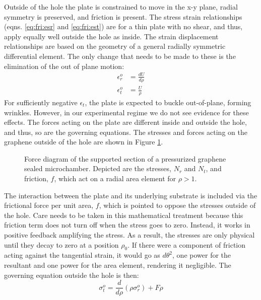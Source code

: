 Outside of the hole the plate is constrained to move in the x-y plane, radial symmetry is preserved, and friction is present. 
The stress strain relationships (eqns. \ref{eq:fri:esr} and \ref{eq:fri:est}) are for a thin plate with no shear, and thus, apply equally well outside the hole as inside.
The strain displacement relationships are based on the geometry of a general radially symmetric differential element.
The only change that needs to be made to these is the elimination of the out of plane motion:
\begin{align}
	\epsilon_r^o&=\frac{dU}{d\rho} \label{eq:fri:edro}\\
	\epsilon_t^o&=\frac{U}{\rho} \label{eq:fri:edto}
\end{align}
For sufficiently negative $\epsilon_t$, the plate is expected to buckle out-of-plane, forming wrinkles.
However, in our experimental regime we do not see evidence for these effects.
The forces acting on the plate are different inside and outside the hole, and thus, so are the governing equations.
The stresses and forces acting on the graphene outside of the hole are shown in Figure \ref{fig:fri:stressfigureo}.
\begin{figure}
	\begin{center}
	
	\end{center}
	\caption[Force diagram of the supported section of a pressurized graphene sealed microchamber]{\label{fig:fri:stressfigureo} Force diagram of the supported section of a pressurized graphene sealed microchamber.  Depicted are the stresses, $N_r$ and $N_t$, and friction, $f$, which act on a radial area element for $\rho>1$.}
\end{figure}
The interaction between the plate and its underlying substrate is included via the frictional force per unit area, $f$, which is pointed to oppose the stresses outside of the hole.
Care needs to be taken in this mathematical treatment because this friction term does not turn off when the stress goes to zero.
Instead, it works in positive feedback amplifying the stress. 
As a result, the stresses are only physical until they decay to zero at a position $\rho_0$.
If there were a component of friction acting against the tangential strain, it would go as $d \theta^2$, one power for the resultant and one power for the area element, rendering it negligible.
The governing equation outside the hole is then:
\begin{equation}
	\sigma_t^o=\frac{d}{d\rho}(\rho \sigma_r^o)+F \rho
	\label{eq:fri:g1o}
\end{equation}
